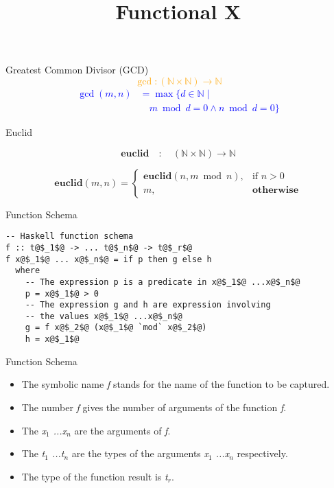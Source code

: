 \documentclass[12pt,t]{beamer}
\title{Functional X}
\begin{document}
{
}

\begin{frame}{Greatest Common Divisor (GCD)}
    \centering
    \Large %
    \textcolor{orange}{\[
        \gcd : (\mathbb{N} \times \mathbb{N}) \to \mathbb{N}
    \]}
        \vspace{0.5cm} %
    \textcolor{blue}{
        \begin{align*}
            \gcd(m,n) &= \max \big\{ d \in \mathbb{N} \mid \\
            &\quad m \bmod d = 0 \wedge n \bmod d = 0 \big\}
        \end{align*}
    }
\end{frame}

\begin{frame}{Euclid}

  \[
\textbf{euclid} \quad : \quad (\mathbb{N} \times \mathbb{N}) \to \mathbb{N}
\]

\[
\textbf{euclid}(m, n) =
\begin{cases}
    \textbf{euclid}(n, m \bmod n), & \text{if } n > 0 \\
    m, & \textbf{otherwise}
\end{cases}
\]

\end{frame}

\begin{frame}[fragile]{Function Schema}
\begin{center}
\vfill
\begin{verbatim}
-- Haskell function schema
f :: t@$_1$@ -> ... t@$_n$@ -> t@$_r$@
f x@$_1$@ ... x@$_n$@ = if p then g else h
  where
    -- The expression p is a predicate in x@$_1$@ ...x@$_n$@
    p = x@$_1$@ > 0
    -- The expression g and h are expression involving
    -- the values x@$_1$@ ...x@$_n$@
    g = f x@$_2$@ (x@$_1$@ `mod` x@$_2$@)
    h = x@$_1$@
\end{verbatim}
\vfill
\end{center}
\end{frame}

\begin{frame}{Function Schema}
\vfill
\begin{center}
\begin{itemize}
  \item The symbolic name \emph{f} stands for the name of the function to be captured.
  \item The number \emph{f} gives the number of arguments of the function \emph{f}.
  \item The \emph{x$_1$ ...x$_n$} are the arguments of \emph{f}.
  \item The \emph{t$_1$ ...t$_n$} are the types of the arguments \emph{x$_1$ ...x$_n$} respectively.
  \item The type of the function result is \emph{t$_r$}.
\end{itemize}
\end{center}
\vfill
\end{frame}
\end{document}
